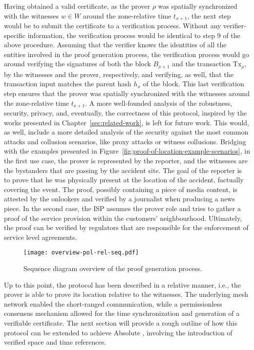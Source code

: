 Having obtained a valid \pol{} certificate, as the prover $\rho$ was spatially synchronized with the witnesses $w \in W$ around the zone-relative time $t_{x+1}$, the next step would be to submit the certificate to a verification process. Without any verifier-specific information, the verification process would be identical to step 9 of the above procedure. Assuming that the verifier knows the identities of all the entities involved in the proof generation process, the verification process would go around verifying the signatures of both the block $B_{x+1}$ and the transaction $\text{Tx}_\rho$, by the witnesses and the prover, respectively, and verifying, as well, that the transaction input matches the parent hash $h_{x}$ of the block. This last verification step ensures that the prover was spatially synchronized with the witnesses around the zone-relative time $t_{x+1}$. A more well-founded analysis of the robustness, security, privacy, and, eventually, the correctness of this \pol{} protocol, inspired by the works presented in Chapter~\ref{sec:related-work}, is left for future work. This would, as well, include a more detailed analysis of the security against the most common attacks and collusion scenarios, like proxy attacks or witness collusions. Bridging with the examples presented in Figure~\ref{fig:proof-of-location-example-scenarios}, in the first use case, the prover is represented by the reporter, and the witnesses are the bystanders that are passing by the accident site. The goal of the reporter is to prove that he was physically present at the location of the accident, factually covering the event. The proof, possibly containing a piece of media content, is attested by the onlookers and verified by a journalist when producing a news piece. In the second case, the ISP assumes the prover role and tries to gather a proof of the service provision within the customers' neighbourhood. Ultimately, the proof can be verified by regulators that are responsible for the enforcement of service level agreements.

\newpage  

\begin{figure}[h!]
    \begin{center}
    \texttt{[image: overview-pol-rel-seq.pdf]}
    \caption{Sequence diagram overview of the proof generation process.}
    \vspace{-0.5cm}
    \label{fig:proof-of-location-overview-relative-pol-seq}
    \end{center}
\end{figure}

Up to this point, the protocol has been described in a relative manner, i.e., the prover is able to prove its location relative to the witnesses. The underlying mesh network enabled the short-ranged communication, while a permissionless consensus mechanism allowed for the time synchronization and generation of a verifiable certificate. The next section will provide a rough outline of how this protocol can be extended to achieve Absolute \pol{}, involving the introduction of verified space and time references.